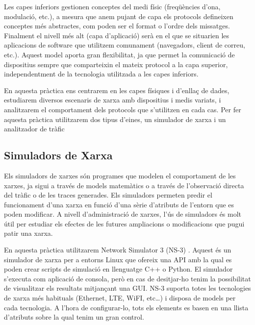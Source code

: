 \documentclass[12pt,a4paper]{article}
\begin{document}
Les capes inferiors gestionen conceptes del medi físic (freqüències d'ona, modulació, etc.), a mesura que anem pujant de capa els protocols defineixen conceptes més abstractes, com poden ser el format o l'ordre dels missatges. Finalment el nivell més alt (capa d'aplicació) serà en el que se situarien les aplicacions de software que utilitzem comunament (navegadors, client de correu, etc.). Aquest model aporta gran flexibilitat, ja que permet la comunicació de dispositius sempre que comparteixin el mateix protocol a la capa superior, independentment de la tecnologia utilitzada a les capes inferiors.

En aquesta pràctica ens centrarem en les capes físiques i d'enllaç de dades, estudiarem diversos escenaris de xarxa amb dispositius i medis variats, i analitzarem el comportament dels protocols que s'utilitzen en cada cas. Per fer aquesta pràctica utilitzarem dos tipus d'eines, un simulador de xarxa i un analitzador de tràfic

\subsection*{Simuladors de Xarxa}
Els simuladors de xarxes són programes que modelen el comportament de les xarxes, ja sigui a través de models matemàtics o a través de l'observació directa del tràfic o de les traces generades. Els simuladors permeten predir el funcionament d'una xarxa en funció d'una sèrie d'atributs de l'entorn que es poden modificar. A nivell d'administració de xarxes, l'ús de simuladors és molt útil per estudiar els efectes de les futures ampliacions o modificacions que pugui patir una xarxa.




En aquesta pràctica utilitzarem Network Simulator 3 (NS-3) \cite{ns3}. Aquest és un simulador de xarxa per a entorns Linux que ofereix una API amb la qual es poden crear scripts de simulació en llenguatge C++ o Python. El simulador s'executa com aplicació de consola, però en cas de desitjar-ho tenim la possibilitat de visualitzar els resultats mitjançant una GUI. NS-3 suporta totes les tecnologies de xarxa més habituals (Ethernet, LTE, WiFI, etc\dots) i disposa de models per cada tecnologia. A l'hora de configurar-lo, tots els elements es basen en una llista d'atributs sobre la qual tenim un gran control.
\end{document}
